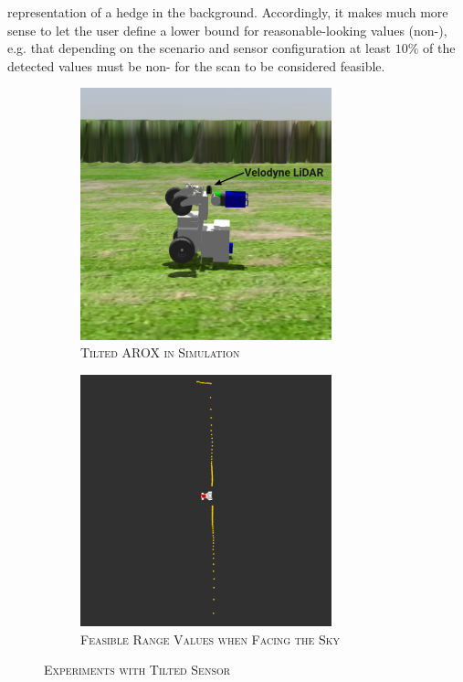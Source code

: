 \documentclass[english, master, utf8]{base/thesis_KBS}
\newcommand{\code}{\collectverb{\codebox}}
\begin{document}
representation of a hedge in the background. Accordingly, it makes much more sense to let the user define a lower bound for reasonable-looking values (non-\code{inf}),
e.g. that depending on the scenario and sensor configuration at least $10$\% of the detected values must be non-\code{inf} for the scan to be considered feasible.
\begin{figure}[H]
    \centering
    \begin{subfigure}[b]{0.49\textwidth}
        \centering
        \includegraphics[width=0.8\textwidth]{pics/tilted_AROX.png}
        \caption{\textsc{Tilted AROX in Simulation}}
        \label{fig:tilted_AROX}
    \end{subfigure}
    \hfill
    \begin{subfigure}[b]{0.49\textwidth}
        \centering
        \includegraphics[width=0.8\textwidth]{pics/straight_line.png}
        \caption{\textsc{Feasible Range Values when Facing the Sky}}
        \label{fig:straight_line}
    \end{subfigure}
\caption{\textsc{Experiments with Tilted Sensor}}
\label{fig:prototype_sim}
\end{figure}
\end{document}
